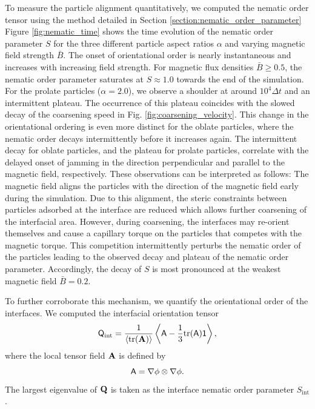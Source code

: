 To measure the particle alignment quantitatively, we computed the
nematic order tensor using the method detailed in Section \ref{section:nematic_order_parameter} 
Figure \ref{fig:nematic_time} shows the time evolution of the nematic
order parameter \(S\) for the three different particle aspect ratios
\(\alpha\) and varying magnetic field strength \(\bar{B}\). The onset of
orientational order is nearly instantaneous and increases with
increasing field strength. For magnetic flux densities
\(\bar{B}\ge0.5\), the nematic order parameter saturates at
\(S\approx 1.0\) towards the end of the simulation. For the prolate
particles (\(\alpha=2.0\)), we observe a shoulder at around
\(10^4\Delta t\) and an intermittent plateau. The occurrence of this
plateau coincides with the slowed decay of the coarsening speed in Fig.
\ref{fig:coarsening_velocity}. This change in the orientational ordering
is even more distinct for the oblate particles, where the nematic order
decays intermittently before it increases again. The intermittent decay
for oblate particles, and the plateau for prolate particles, correlate
with the delayed onset of jamming in the direction perpendicular and
parallel to the magnetic field, respectively. These observations can be
interpreted as follows: The magnetic field aligns the particles with the
direction of the magnetic field early during the simulation. Due to this
alignment, the steric constraints between particles adsorbed at the
interface are reduced which allows further coarsening of the interfacial
area. However, during coarsening, the interfaces may re-orient
themselves and cause a capillary torque on the particles that competes
with the magnetic torque. This competition intermittently perturbs the
nematic order of the particles leading to the observed decay and plateau
of the nematic order parameter. Accordingly, the decay of \(S\) is most
pronounced at the weakest magnetic field \(\bar{B}=0.2\).

To further corroborate this mechanism, we quantify the orientational
order of the interfaces. We computed the interfacial orientation tensor
%
\begin{equation}
\tens{Q}_{\text{int}} = \frac{1}{\langle \mathrm{tr}(\tens{A}) \rangle} 
\left\langle \tens{A} - \frac{1}{3} \mathrm{tr}(\tens{A}) \mathsf{1} \right\rangle ,
\end{equation}
%
where the local tensor field $\tens{A}$ is defined by
%
\begin{equation}
\tens{A} = \nabla\phi\otimes\nabla\phi .
\end{equation}
%
The largest eigenvalue of $\tens{Q}$ is taken as the
interface nematic order parameter $S_{\text{int}}$.

